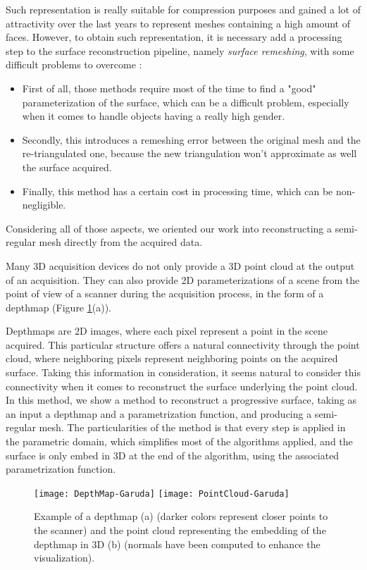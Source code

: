 \documentclass[11pt,fleqn]{book} %
\begin{document}
Such representation is really suitable for compression purposes \cite{MLDH15} and gained a lot of attractivity over the last years to represent meshes containing a high amount of faces.
However, to obtain such representation, it is necessary add a processing step to the surface reconstruction pipeline, namely \textit{surface remeshing}, with some difficult problems to overcome :
\begin{itemize}
	\item First of all, those methods require most of the time to find a "good" parameterization of the surface, which can be a difficult problem, especially when it comes to handle objects having a really high gender.
	\item Secondly, this introduces a remeshing error between the original mesh and the re-triangulated one, because the new triangulation won't approximate as well the surface acquired.
	\item Finally, this method has a certain cost in processing time, which can be non-negligible.
\end{itemize}

Considering all of those aspects, we oriented our work into reconstructing a semi-regular mesh directly from the acquired data.

Many 3D acquisition devices do not only provide a 3D point cloud at the output of an acquisition. 
They can also provide 2D parameterizations of a scene from the point of view of a scanner during the acquisition process, in the form of a depthmap (Figure \ref{fig:depthmap_point_cloud}(a)).

Depthmaps are 2D images, where each pixel represent a point in the scene acquired. This particular structure offers a natural connectivity through the point cloud, where neighboring pixels represent neighboring points on the acquired surface.
Taking this information in consideration, it seems natural to consider this connectivity when it comes to reconstruct the surface underlying the point cloud. 
In this method, we show a method to reconstruct a progressive surface, taking as an input a depthmap and a parametrization function, and producing a semi-regular mesh.
The particularities of the method is that every step is applied in the parametric domain, which simplifies most of the algorithms applied, and the surface is only embed in 3D at the end of the algorithm, using the associated parametrization function.

\begin{figure}[ht]
\centering\texttt{[image: DepthMap-Garuda]}
\centering\texttt{[image: PointCloud-Garuda]}
\caption{Example of a depthmap (a) (darker colors represent closer points to the scanner) and the point cloud representing the embedding of the depthmap in 3D (b) (normals have been computed to enhance the visualization).}
\label{fig:depthmap_point_cloud}
\end{figure}
\end{document}
